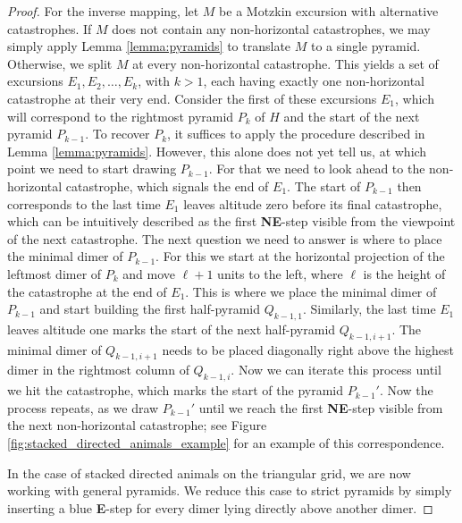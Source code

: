 \begin{proof}
For the inverse mapping, let $M$ be a Motzkin excursion with alternative catastrophes. If $M$ does not contain any non-horizontal catastrophes, we may simply apply Lemma \ref{lemma:pyramids} to translate $M$ to a single pyramid. Otherwise, we split $M$ at every non-horizontal catastrophe. This yields a set of excursions $E_1,E_2,\dots,E_k$, with $k > 1$, each having exactly one non-horizontal catastrophe at their very end.
Consider the first of these excursions $E_1$, which will correspond to the rightmost pyramid $P_k$ of $H$ and the start of the next pyramid $P_{k-1}$. To recover $P_k$, it suffices to apply the procedure described in Lemma \ref{lemma:pyramids}.
However, this alone does not yet tell us, at which point we need to start drawing $P_{k-1}$. For that we need to look ahead to the non-horizontal catastrophe, which signals the end of $E_1$. The start of $P_{k-1}$ then corresponds to the last time $E_1$ leaves altitude zero before its final catastrophe, which can be intuitively described as the first \textbf{NE}-step visible from the viewpoint of the next catastrophe. The next question we need to answer is where to place the minimal dimer of $P_{k-1}$. 
For this we start at the horizontal projection of the leftmost dimer of $P_k$ and move $\ell + 1$ units to the left, where $\ell$ is the height of the catastrophe at the end of $E_1$. This is where we place the minimal dimer of $P_{k-1}$ and start building the first half-pyramid $Q_{k-1,1}$.
Similarly, the last time $E_1$ leaves altitude one marks the start of the next half-pyramid $Q_{k-1,i+1}$. The minimal dimer of $Q_{k-1,i+1}$ needs to be placed diagonally right above the highest dimer in the rightmost column of $Q_{k-1,i}$.
Now we can iterate this process until we hit the catastrophe, which marks the start of the pyramid $P_{k-1}'$. 
Now the process repeats, as we draw $P_{k-1}'$ until we reach the first \textbf{NE}-step visible from the next non-horizontal catastrophe; see Figure \ref{fig:stacked_directed_animals_example} for an example of this correspondence.

In the case of stacked directed animals on the triangular grid, we are now working with general pyramids. We reduce this case to strict pyramids by simply inserting a blue {\color{blue}\textbf{E}}-step for every dimer lying directly above another dimer.
\end{proof}